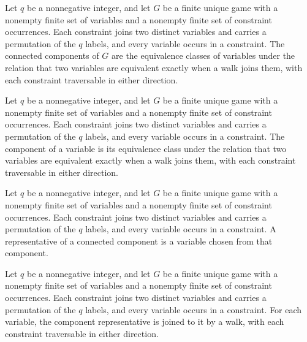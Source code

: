 \begin{definition}
\label{FABL.FiniteUniqueGame.ConnectedComponent}
\leanok
{}
Let $q$ be a nonnegative integer, and let $G$ be a finite unique game with a nonempty
finite set of variables and a nonempty finite set of constraint occurrences. Each
constraint joins two distinct variables and carries a permutation of the $q$ labels, and
every variable occurs in a constraint. The connected components of $G$ are the
equivalence classes of variables under the relation that two variables are equivalent
exactly when a walk joins them, with each constraint traversable in either direction.
\end{definition}

\begin{definition}
\label{FABL.FiniteUniqueGame.component}
\leanok
{}
Let $q$ be a nonnegative integer, and let $G$ be a finite unique game with a nonempty
finite set of variables and a nonempty finite set of constraint occurrences. Each
constraint joins two distinct variables and carries a permutation of the $q$ labels, and
every variable occurs in a constraint. The component of a variable is its equivalence
class under the relation that two variables are equivalent exactly when a walk joins
them, with each constraint traversable in either direction.
\end{definition}

\begin{definition}
\label{FABL.FiniteUniqueGame.componentRoot}
\leanok
{}
Let $q$ be a nonnegative integer, and let $G$ be a finite unique game with a nonempty
finite set of variables and a nonempty finite set of constraint occurrences. Each
constraint joins two distinct variables and carries a permutation of the $q$ labels, and
every variable occurs in a constraint. A representative of a connected component is a
variable chosen from that component.
\end{definition}

\begin{definition}
\label{FABL.FiniteUniqueGame.componentPath}
\leanok
{}
Let $q$ be a nonnegative integer, and let $G$ be a finite unique game with a nonempty
finite set of variables and a nonempty finite set of constraint occurrences. Each
constraint joins two distinct variables and carries a permutation of the $q$ labels, and
every variable occurs in a constraint. For each variable, the component representative
is joined to it by a walk, with each constraint traversable in either direction.
\end{definition}

